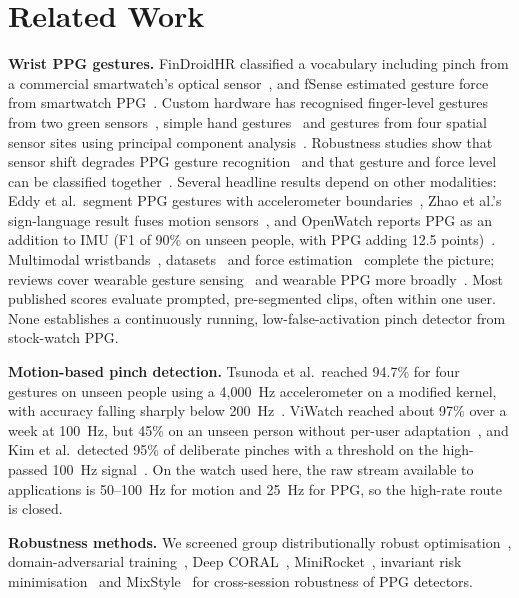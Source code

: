 \section{Related Work}

\textbf{Wrist PPG gestures.} FinDroidHR classified a vocabulary including pinch from a commercial smartwatch's optical sensor~\cite{zhang2018findroidhr}, and fSense estimated gesture force from smartwatch PPG~\cite{buddhika2019fsense}. Custom hardware has recognised finger-level gestures from two green sensors~\cite{zhao2018ppg}, simple hand gestures~\cite{subramanian2020ppg} and gestures from four spatial sensor sites using principal component analysis~\cite{ruan2022pca}. Robustness studies show that sensor shift degrades PPG gesture recognition~\cite{fang2023shift} and that gesture and force level can be classified together~\cite{li2023force}. Several headline results depend on other modalities: Eddy et al.\ segment PPG gestures with accelerometer boundaries~\cite{eddy2024multimodal}, Zhao et al.'s sign-language result fuses motion sensors~\cite{zhao2021sign}, and OpenWatch reports PPG as an addition to IMU (F1 of 90\% on unseen people, with PPG adding 12.5 points)~\cite{bonazzi2026openwatch}. Multimodal wristbands~\cite{wang2022wristband,multimodal2026emg}, datasets~\cite{hauptmann2026mudpad} and force estimation~\cite{hu2026watchforce} complete the picture; reviews cover wearable gesture sensing~\cite{tchantchane2023review} and wearable PPG more broadly~\cite{charlton2023roadmap}. Most published scores evaluate prompted, pre-segmented clips, often within one user. None establishes a continuously running, low-false-activation pinch detector from stock-watch PPG.

\textbf{Motion-based pinch detection.} Tsunoda et al.\ reached 94.7\% for four gestures on unseen people using a 4{,}000~Hz accelerometer on a modified kernel, with accuracy falling sharply below 200~Hz~\cite{tsunoda2024}. ViWatch reached about 97\% over a week at 100~Hz, but 45\% on an unseen person without per-user adaptation~\cite{viwatch2023}, and Kim et al.\ detected 95\% of deliberate pinches with a threshold on the high-passed 100~Hz signal~\cite{kim2025pinch}. On the watch used here, the raw stream available to applications is 50--100~Hz for motion and 25~Hz for PPG, so the high-rate route is closed.

\textbf{Robustness methods.} We screened group distributionally robust optimisation~\cite{sagawa2019dro}, domain-adversarial training~\cite{ganin2015dann}, Deep CORAL~\cite{sun2016coral}, MiniRocket~\cite{dempster2020minirocket}, invariant risk minimisation~\cite{arjovsky2019irm} and MixStyle~\cite{zhou2021mixstyle} for cross-session robustness of PPG detectors.


